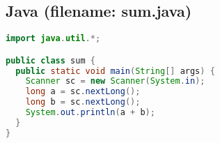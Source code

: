 \documentclass[12pt,a4paper]{article}
\begin{document}
\subsection*{Java (filename: sum.java)}
\begin{lstlisting}[language=Java]
import java.util.*;

public class sum {
  public static void main(String[] args) {
    Scanner sc = new Scanner(System.in);
    long a = sc.nextLong();
    long b = sc.nextLong();
    System.out.println(a + b);
  }
}
\end{lstlisting}
\end{document}
